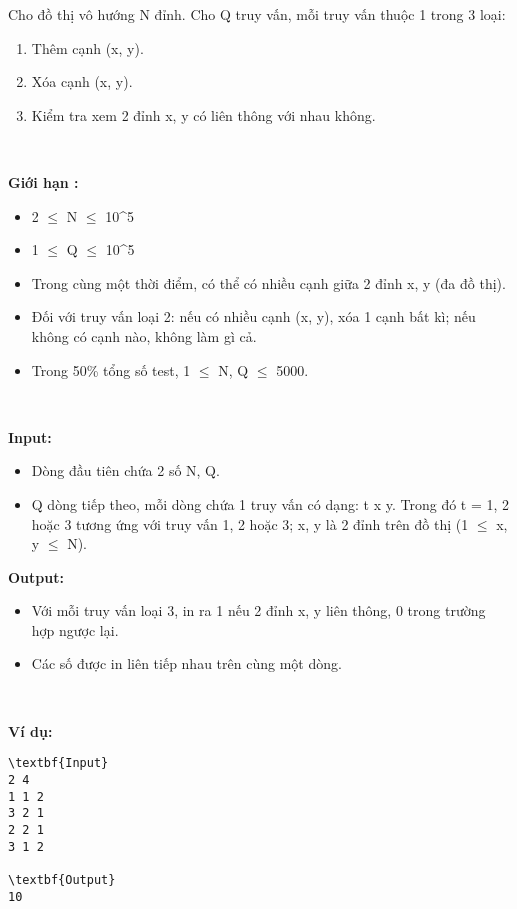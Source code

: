 

Cho đồ thị vô hướng N đỉnh. Cho Q truy vấn, mỗi truy vấn thuộc 1 trong 3 loại:
\begin{enumerate}
	\item Thêm cạnh (x, y).
	\item Xóa cạnh (x, y).
	\item Kiểm tra xem 2 đỉnh x, y có liên thông với nhau không.
\end{enumerate}

 

\textbf{Giới hạn : }
\begin{itemize}
	\item 2  $\le$  N  $\le$  10\textasciicircum5
	\item 1  $\le$  Q  $\le$  10\textasciicircum5
	\item Trong cùng một thời điểm, có thể có nhiều cạnh giữa 2 đỉnh x, y (đa đồ thị).
	\item Đối với truy vấn loại 2: nếu có nhiều cạnh (x, y), xóa 1 cạnh bất kì; nếu không có cạnh nào, không làm gì cả.
	\item Trong 50\% tổng số test, 1  $\le$  N, Q  $\le$  5000.
\end{itemize}

 

\textbf{Input: }
\begin{itemize}
	\item Dòng đầu tiên chứa 2 số N, Q.
	\item Q dòng tiếp theo, mỗi dòng chứa 1 truy vấn có dạng: t x y. Trong đó t = 1, 2 hoặc 3 tương ứng với truy vấn 1, 2 hoặc 3; x, y là 2 đỉnh trên đồ thị (1  $\le$  x, y  $\le$  N).
\end{itemize}

\textbf{Output: }
\begin{itemize}
	\item Với mỗi truy vấn loại 3, in ra 1 nếu 2 đỉnh x, y liên thông, 0 trong trường hợp ngược lại.
	\item Các số được in liên tiếp nhau trên cùng một dòng.
\end{itemize}

 

\textbf{Ví dụ: }
\begin{verbatim}
\textbf{Input}
2 4
1 1 2
3 2 1
2 2 1
3 1 2

\textbf{Output}
10


\end{verbatim}
